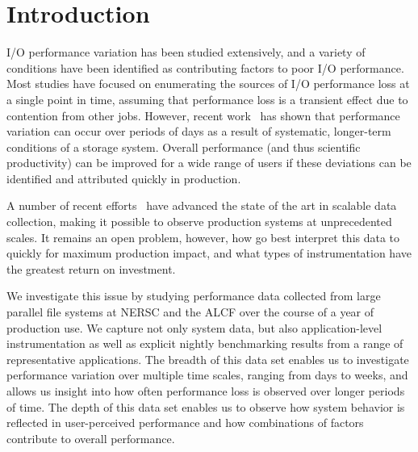\section{Introduction}

I/O performance variation has been studied extensively, and a variety of conditions have been identified as contributing factors to poor I/O performance.  Most studies have focused on enumerating the sources of I/O performance loss at a single point in time, assuming that performance loss is a transient effect due to contention from other jobs.  However, recent work~\cite{Lockwood2017} has shown that performance variation can occur over periods of days as a result of systematic, longer-term conditions of a storage system.
%
Overall performance (and thus scientific productivity) can be improved for a
wide range of users if these deviations can be identified and attributed
quickly in production.


A number of recent efforts~\cite{TODO:tokio,guide,ldms,siox} have advanced the
state of the art in scalable data collection, making it possible to observe
production systems at unprecedented scales.  It remains an open problem,
however, how go best interpret this data to quickly for maximum production
impact, and what types of instrumentation have the greatest return on
investment.

We investigate this issue by studying performance data collected from
large parallel file systems at NERSC and the ALCF over the course of
a year of production use.  We capture not only system data, but also
application-level instrumentation as well as explicit nightly benchmarking
results from a range of representative applications.  The breadth of
this data set enables us to investigate performance variation over
multiple time scales, ranging from days to weeks, and allows us insight
into how often performance loss is observed over longer periods of time.
The depth of this data set enables us to observe how system behavior is
reflected in user-perceived performance and how combinations of factors
contribute to overall performance.

